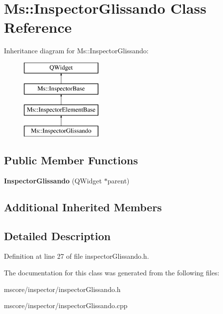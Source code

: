 \hypertarget{class_ms_1_1_inspector_glissando}{}\section{Ms\+:\+:Inspector\+Glissando Class Reference}
\label{class_ms_1_1_inspector_glissando}
Inheritance diagram for Ms\+:\+:Inspector\+Glissando\+:\begin{figure}[H]
\begin{center}
\leavevmode
\includegraphics[height=4.000000cm]{class_ms_1_1_inspector_glissando}
\end{center}
\end{figure}
\subsection*{Public Member Functions}
\begin{DoxyCompactItemize}
\item 
\mbox{\label{class_ms_1_1_inspector_glissando_a7f25ea8108f5372f6da8d6d3ac4c6acc}} 
{\bfseries Inspector\+Glissando} (Q\+Widget $\ast$parent)
\end{DoxyCompactItemize}
\subsection*{Additional Inherited Members}


\subsection{Detailed Description}


Definition at line 27 of file inspector\+Glissando.\+h.



The documentation for this class was generated from the following files\+:\begin{DoxyCompactItemize}
\item 
mscore/inspector/inspector\+Glissando.\+h\item 
mscore/inspector/inspector\+Glissando.\+cpp\end{DoxyCompactItemize}
